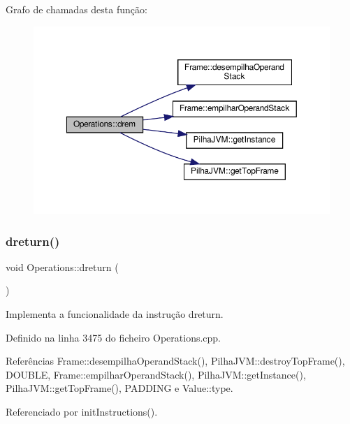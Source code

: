 Grafo de chamadas desta função\+:\nopagebreak
\begin{figure}[H]
\begin{center}
\leavevmode
\includegraphics[width=350pt]{classOperations_abe333415749dbd2331ce89dc5e2233c5_cgraph}
\end{center}
\end{figure}
\mbox{\label{classOperations_a85ce8267820ffcc1e1530d533545c9f3}} 
\subsubsection{\texorpdfstring{dreturn()}{dreturn()}}
{\footnotesize\ttfamily void Operations\+::dreturn (\begin{DoxyParamCaption}{ }\end{DoxyParamCaption})\hspace{0.3cm}{\ttfamily [private]}}



Implementa a funcionalidade da instrução dreturn. 



Definido na linha 3475 do ficheiro Operations.\+cpp.



Referências Frame\+::desempilha\+Operand\+Stack(), Pilha\+J\+V\+M\+::destroy\+Top\+Frame(), D\+O\+U\+B\+LE, Frame\+::empilhar\+Operand\+Stack(), Pilha\+J\+V\+M\+::get\+Instance(), Pilha\+J\+V\+M\+::get\+Top\+Frame(), P\+A\+D\+D\+I\+NG e Value\+::type.



Referenciado por init\+Instructions().


